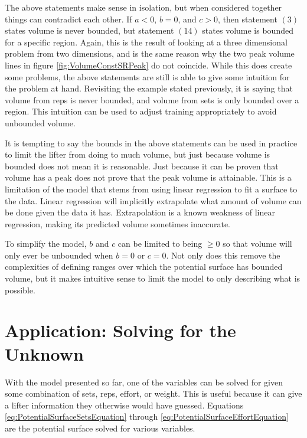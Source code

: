 The above statements make sense in isolation, but when considered together things can contradict each other. If $a<0$, $b=0$, and $c>0$, then  statement $(3)$ states volume is never bounded, but statement $(14)$ states volume is bounded for a specific region. Again, this is the result of looking at a three dimensional problem from two dimensions, and is the same reason why the two peak volume lines in figure \ref{fig:VolumeConstSRPeak} do not coincide. While this does create some problems, the above statements are still is able to give some intuition for the problem at hand. Revisiting the example stated previously, it is saying that volume from reps is never bounded, and volume from sets is only bounded over a region. This intuition can be used to adjust training appropriately to avoid unbounded volume.

It is tempting to say the bounds in the above statements can be used in practice to limit the lifter from doing to much volume, but just because volume is bounded does not mean it is reasonable. Just because it can be proven that volume has a peak does not prove that the peak volume is attainable. This is a limitation of the model that stems from using linear regression to fit a surface to the data. Linear regression will implicitly extrapolate what amount of volume can be done given the data it has. Extrapolation is a known weakness of linear regression, making its predicted volume sometimes inaccurate.

To simplify the model, $b$ and $c$ can be limited to being $\ge 0$ so that volume will only ever be unbounded when $b=0$ or $c=0$. Not only does this remove the complexities of defining ranges over which the potential surface has bounded volume, but it makes intuitive sense to limit the model to only describing what is possible.

\section{Application: Solving for the Unknown}
\label{sec:PotentialSurfaceSolvingForTheUnknown}

With the model presented so far, one of the variables can be solved for given some combination of sets, reps, effort, or weight. This is useful because it can give a lifter information they otherwise would have guessed. Equations \ref{eq:PotentialSurfaceSetsEquation} through \ref{eq:PotentialSurfaceEffortEquation} are the potential surface solved for various variables.

